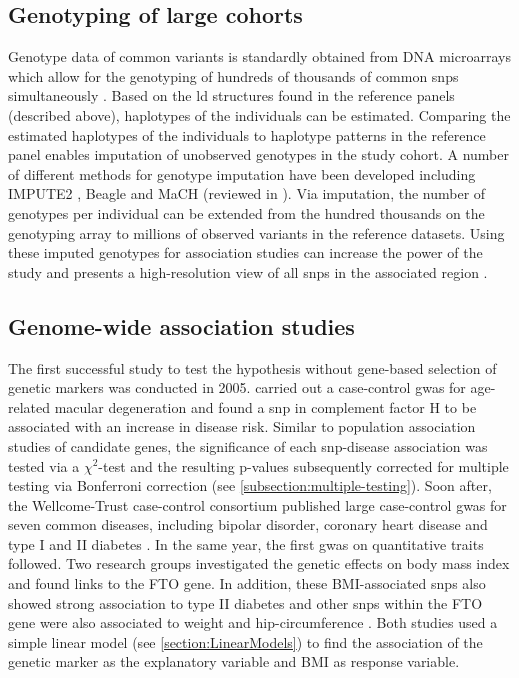 \subsection{Genotyping of large cohorts}
Genotype data of common variants is standardly obtained from DNA microarrays which allow for the genotyping of hundreds of thousands of common \glspl{snp} simultaneously \citep{Wang1998}. Based on the \gls{ld} structures found in the reference panels (described above), haplotypes of the individuals can be estimated. Comparing the estimated haplotypes of the individuals to haplotype patterns in the reference panel enables imputation of unobserved genotypes in the study cohort. A number of different methods for genotype imputation have been developed including IMPUTE2 \citep{Howie2009}, Beagle \citep{Browning2007} and MaCH \citep{Li2010} (reviewed in \citep{Marchini2010}). Via imputation, the number of genotypes per individual can be extended from the hundred thousands on the genotyping array to millions of observed variants in the reference datasets. Using these imputed genotypes for association studies can increase the power of the study and presents a high-resolution view of all \glspl{snp} in the associated region \citep{Marchini2010}.

\subsection{Genome-wide association studies}
\label{subsection:GWAS}
The first successful study to test the  hypothesis without gene-based selection of genetic markers was conducted in 2005. \citet{Klein2005} carried out a case-control \gls{gwas} for age-related macular degeneration and found a \gls{snp} in complement factor H to be associated with an increase in disease risk. Similar to population association studies of candidate genes, the significance of each \gls{snp}-disease association was tested via a \(\chi ^2\)-test and the resulting p-values subsequently corrected for multiple testing via Bonferroni correction (see \cref{subsection:multiple-testing}). Soon after, the Wellcome-Trust case-control consortium published large case-control \gls{gwas} for seven common diseases, including bipolar disorder, coronary heart disease and type I and II diabetes \citep{Burton2007}. In the same year, the first \gls{gwas} on quantitative traits followed. Two research groups investigated the genetic effects on body mass index and found links to the FTO gene. In addition, these BMI-associated \glspl{snp} also showed strong association to type II diabetes \citep{Frayling2007} and other \glspl{snp} within the FTO gene were also associated to weight and hip-circumference \citep{Scuteri2007}. Both studies used a simple linear model  (see \cref{section:LinearModels}) to find the association of the genetic marker as the explanatory variable and BMI as response variable. 

